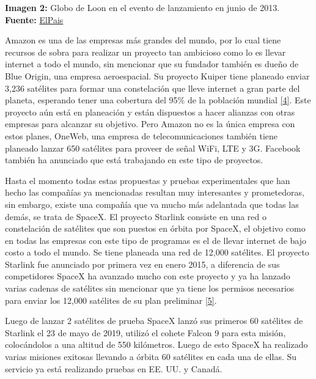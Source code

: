 \documentclass[12pt,spanish,Letterpaper,openany]{book}
\newcommand{\spacefivemilis}{\vspace{5mm}}
\begin{document}
\textbf{Imagen 2:} Globo de Loon en el evento de lanzamiento en junio de 2013. \textbf{Fuente:} \href{https://elpais.com/elpais/2018/07/24/planeta_futuro/1532414715_476889.html}{ElPais}


\hypertarget{articulo04_cross04}{}

\spacefivemilis

Amazon es una de las empresas más grandes del mundo, por lo cual tiene recursos de sobra para realizar un proyecto tan ambicioso como lo es llevar internet a todo el mundo, sin mencionar que su fundador también es dueño de Blue Origin, una empresa aeroespacial. Su proyecto Kuiper tiene planeado enviar 3,236 satélites para formar una constelación que lleve internet a gran parte del planeta, esperando tener una cobertura del 95\% de la población mundial \protect\hyperlink{articulo04_ref04}{{[}4{]}}. Este proyecto aún está en planeación y están dispuestos a hacer alianzas con otras empresas para alcanzar su objetivo. Pero Amazon no es la única empresa con estos planes, OneWeb, una empresa de telecomunicaciones también tiene planeado lanzar 650 satélites para proveer de señal WiFi, LTE y 3G. Facebook también ha anunciado que está trabajando en este tipo de proyectos.

\spacefivemilis
\hypertarget{articulo04_cross05}{}

Hasta el momento todas estas propuestas y pruebas experimentales que han hecho las compañías ya mencionadas resultan muy interesantes y prometedoras, sin embargo, existe una compañía que va mucho más adelantada que todas las demás, se trata de SpaceX. El proyecto Starlink consiste en una red o constelación de satélites que son puestos en órbita por SpaceX, el objetivo como en todas las empresas con este tipo de programas es el de llevar internet de bajo costo a todo el mundo. Se tiene planeada una red de 12,000 satélites. El proyecto Starlink fue anunciado por primera vez en enero 2015, a diferencia de sus competidores SpaceX ha avanzado mucho con este proyecto y ya ha lanzado varias cadenas de satélites sin mencionar que ya tiene los permisos necesarios para enviar los 12,000 satélites de su plan preliminar \protect\hyperlink{articulo04_ref05}{{[}5{]}}.

\spacefivemilis

Luego de lanzar 2 satélites de prueba SpaceX lanzó sus primeros 60 satélites de Starlink el 23 de mayo de 2019, utilizó el cohete Falcon 9 para esta misión, colocándolos a una altitud de 550 kilómetros. Luego de esto SpaceX ha realizado varias misiones exitosas llevando a órbita 60 satélites en cada una de ellas. Su servicio ya está realizando pruebas en EE. UU. y Canadá.
\end{document}
